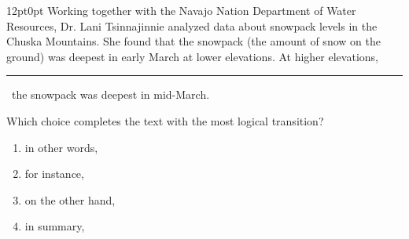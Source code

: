\documentclass[11pt, twocolumn]{article}
\newcounter{questionnum}
\begin{document}
\vspace{6pt}\noindent
\begin{minipage}{\columnwidth}\raggedright
\noindent{}\par\vspace{8pt}
\begin{adjustwidth}{12pt}{0pt}
Working together with the Navajo Nation Department of Water Resources, Dr. Lani Tsinnajinnie analyzed data about snowpack levels in the Chuska Mountains. She found that the snowpack (the amount of snow on the ground) was deepest in early March at lower elevations. At higher elevations, \,\rule{2cm}{0.4pt}\, the snowpack was deepest in mid-March.
\vspace{6pt}

Which choice completes the text with the most logical transition?
\begin{enumerate}[label=\Alph*),leftmargin=18pt,topsep=3pt,itemsep=2pt]
  \item in other words,
  \item for instance,
  \item on the other hand,
  \item in summary,
\end{enumerate}
\end{adjustwidth}
\end{minipage}\par
\end{document}
